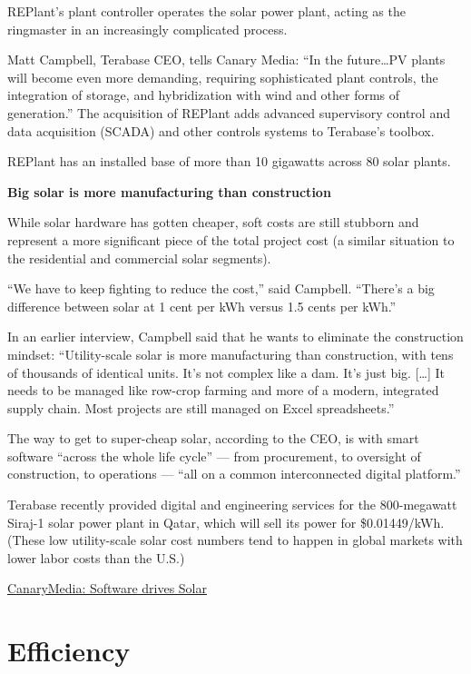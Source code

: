 \documentclass[
]{book}
\begin{document}
REPlant's plant controller operates the solar power plant, acting as the ringmaster in an increasingly complicated process.

Matt Campbell, Terabase CEO, tells Canary Media: ``In the future\ldots PV plants will become even more demanding, requiring sophisticated plant controls, the integration of storage, and hybridization with wind and other forms of generation.'' The acquisition of REPlant adds advanced supervisory control and data acquisition (SCADA) and other controls systems to Terabase's toolbox.

REPlant has an installed base of more than 10 gigawatts across 80 solar plants.

\textbf{Big solar is more manufacturing than construction}

While solar hardware has gotten cheaper, soft costs are still stubborn and represent a more significant piece of the total project cost (a similar situation to the residential and commercial solar segments).

``We have to keep fighting to reduce the cost,'' said Campbell. ``There's a big difference between solar at 1 cent per kWh versus 1.5 cents per kWh.''

In an earlier interview, Campbell said that he wants to eliminate the construction mindset: ``Utility-scale solar is more manufacturing than construction, with tens of thousands of identical units. It's not complex like a dam. It's just big. {[}\ldots{]} It needs to be managed like row-crop farming and more of a modern, integrated supply chain. Most projects are still managed on Excel spreadsheets.''

The way to get to super-cheap solar, according to the CEO, is with smart software ``across the whole life cycle'' --- from procurement, to oversight of construction, to operations --- ``all on a common interconnected digital platform.''

Terabase recently provided digital and engineering services for the 800-megawatt Siraj-1 solar power plant in Qatar, which will sell its power for \$0.01449/kWh. (These low utility-scale solar cost numbers tend to happen in global markets with lower labor costs than the U.S.)

\href{https://www.canarymedia.com/articles/software-will-eat-solar-driving-utility-scale-solar-prices-below-1-cent-per-kilowatt-hour-by-2025/}{CanaryMedia: Software drives Solar}

\hypertarget{efficiency}{%
\section{Efficiency}\label{efficiency}}
\end{document}
